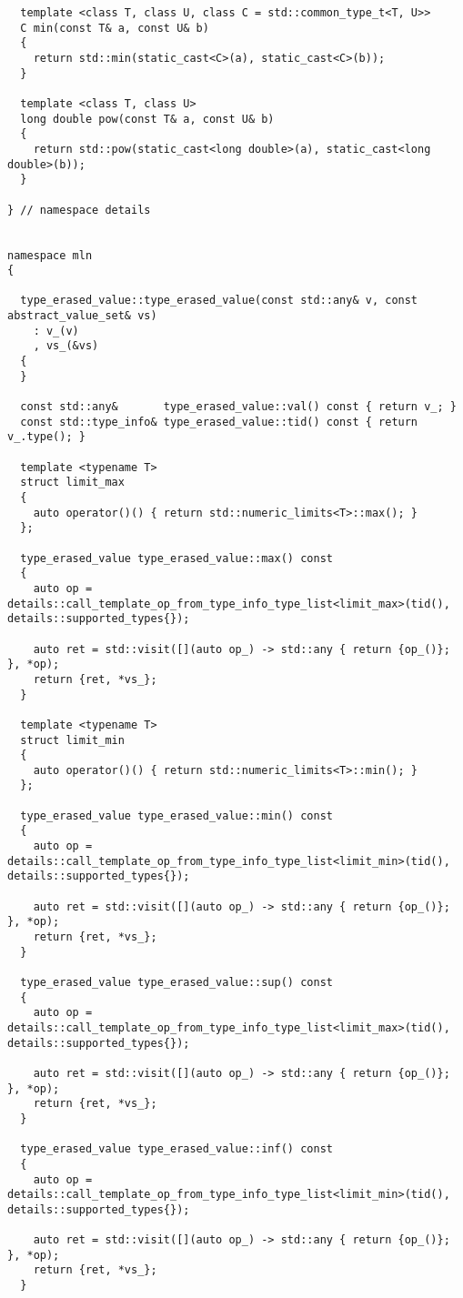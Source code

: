 \begin{verbatim}
  template <class T, class U, class C = std::common_type_t<T, U>>
  C min(const T& a, const U& b)
  {
    return std::min(static_cast<C>(a), static_cast<C>(b));
  }

  template <class T, class U>
  long double pow(const T& a, const U& b)
  {
    return std::pow(static_cast<long double>(a), static_cast<long double>(b));
  }

} // namespace details


namespace mln
{

  type_erased_value::type_erased_value(const std::any& v, const abstract_value_set& vs)
    : v_(v)
    , vs_(&vs)
  {
  }

  const std::any&       type_erased_value::val() const { return v_; }
  const std::type_info& type_erased_value::tid() const { return v_.type(); }

  template <typename T>
  struct limit_max
  {
    auto operator()() { return std::numeric_limits<T>::max(); }
  };

  type_erased_value type_erased_value::max() const
  {
    auto op = details::call_template_op_from_type_info_type_list<limit_max>(tid(), details::supported_types{});

    auto ret = std::visit([](auto op_) -> std::any { return {op_()}; }, *op);
    return {ret, *vs_};
  }

  template <typename T>
  struct limit_min
  {
    auto operator()() { return std::numeric_limits<T>::min(); }
  };

  type_erased_value type_erased_value::min() const
  {
    auto op = details::call_template_op_from_type_info_type_list<limit_min>(tid(), details::supported_types{});

    auto ret = std::visit([](auto op_) -> std::any { return {op_()}; }, *op);
    return {ret, *vs_};
  }

  type_erased_value type_erased_value::sup() const
  {
    auto op = details::call_template_op_from_type_info_type_list<limit_max>(tid(), details::supported_types{});

    auto ret = std::visit([](auto op_) -> std::any { return {op_()}; }, *op);
    return {ret, *vs_};
  }

  type_erased_value type_erased_value::inf() const
  {
    auto op = details::call_template_op_from_type_info_type_list<limit_min>(tid(), details::supported_types{});

    auto ret = std::visit([](auto op_) -> std::any { return {op_()}; }, *op);
    return {ret, *vs_};
  }


\end{verbatim}
